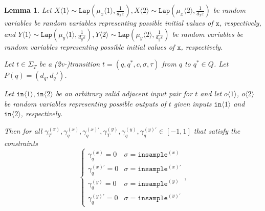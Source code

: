 \documentclass[12pt]{article}
\newcommand{\brangle}[1]{\langle#1 \rangle}
\newcommand{\Lap}{\texttt{Lap}}
\newtheorem{lemma}[thm]{Lemma}
\theoremstyle{definition}
\begin{document}
\begin{lemma}\label{mvIndTransitionCoupling}
    Let $X\brangle{1}\sim \Lap(\mu_x\brangle{1}, \frac{1}{d_x\varepsilon}), X\brangle{2}\sim\Lap(\mu_x\brangle{2}, \frac{1}{d_x\varepsilon})$ be random variables be random variables representing possible initial values of $\texttt{x}$, respectively, and $Y\brangle{1}\sim \Lap(\mu_y\brangle{1}, \frac{1}{d_y\varepsilon}), Y\brangle{2}\sim\Lap(\mu_y\brangle{2}, \frac{1}{d_y\varepsilon})$ be random variables be random variables representing possible initial values of $\texttt{x}$, respectively. 

    Let $t\in \Sigma_T$ be a  (2v-)transition $t = (q, q^*, c, \sigma, \tau)$ from $q$ to $q^*\in Q$. Let $P(q) = (d_q, d_q')$.

    Let $\texttt{in}\brangle{1}, \texttt{in}\brangle{2}$ be an arbitrary valid adjacent input pair for $t$ and let $o\brangle{1}$, $o\brangle{2}$ be random variables representing possible outputs of $t$ given inputs $\texttt{in}\brangle{1}$ and $\texttt{in}\brangle{2}$, respectively. 

    Then for all $\gamma_T^{(x)}, \gamma_q^{(x)}, \gamma_q^{(x)\prime},\gamma_T^{(y)}, \gamma_q^{(y)}, \gamma_q^{(y)\prime} \in [-1, 1]$ that satisfy the constraints \[
        \begin{cases}
          \gamma_q^{(x)}=0 & \sigma = \texttt{insample}^{(x)}\\
          \gamma_q^{(x)\prime}=0 & \sigma = \texttt{insample}^{(x)\prime}\\
          \gamma_q^{(y)}=0 & \sigma = \texttt{insample}^{(y)}\\
          \gamma_q^{(y)\prime}=0 & \sigma = \texttt{insample}^{(y)\prime}
        \end{cases},
      \]


\end{lemma}
\end{document}
